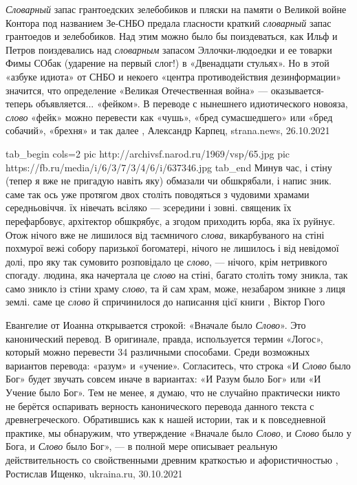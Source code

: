 \emph{Словарный} запас грантоедских зелебобиков и пляски на памяти о Великой войне
Контора под названием Зе-СНБО предала гласности краткий \emph{словарный} запас
грантоедов и зелебобиков. Над этим можно было бы поиздеваться, как Ильф и
Петров поиздевались над \emph{словарным} запасом Эллочки-людоедки и ее товарки Фимы
СОбак (ударение на первый слог!) в «Двенадцати стульях». Но в этой «азбуке
идиота» от СНБО и некоего «центра противодействия дезинформации» значится, что
определение «Великая Отечественная война» — оказывается- теперь объявляется...
«фейком». В переводе с нынешнего идиотического новояза, \emph{слово} «фейк» можно
перевести как «чушь», «бред сумасшедшего» или «бред собачий», «брехня» и так
далее
, 
Александр Карпец, strana.news, 26.10.2021


\ifcmt
  tab_begin cols=2
     pic http://archivsf.narod.ru/1969/vsp/65.jpg
     pic https://fb.ru/media/i/6/3/7/3/4/6/i/637346.jpg
  tab_end
\fi
Минув час, і стіну (тепер я вже не пригадую навіть яку) обмазали чи обшкрябали,
і напис зник. саме так ось уже протягом двох століть поводяться з чудовими
храмами середньовіччя. їх нівечать всіляко — зсередини і зовні.  священик їх
перефарбовує, архітектор обшкрябує, а згодом приходить юрба, яка їх руйнує.
Отож нічого вже не лишилося від таємничого \emph{слова}, викарбуваного на стіні
похмурої вежі собору паризької богоматері, нічого не лишилось і від невідомої
долі, про яку так сумовито розповідало це \emph{слово}, — нічого, крім
нетривкого спогаду. людина, яка начертала це \emph{слово} на стіні, багато
століть тому зникла, так само зникло із стіни храму \emph{слово}, та й сам
храм, може, незабаром зникне з лиця землі. саме це \emph{слово} й спричинилося
до написання цієї книги
, Віктор Гюго

Евангелие от Иоанна открывается строкой: «Вначале было \emph{Слово}». Это
канонический перевод. В оригинале, правда, используется термин «Логос», который
можно перевести 34 различными способами. Среди возможных вариантов перевода:
«разум» и «учение». Согласитесь, что строка «И \emph{Слово} было Бог» будет
звучать совсем иначе в вариантах: «И Разум было Бог» или «И Учение было Бог».
Тем не менее, я думаю, что не случайно практически никто не берётся оспаривать
верность канонического перевода данного текста с древнегреческого. Обратившись
как к нашей истории, так и к повседневной практике, мы обнаружим, что
утверждение «Вначале было \emph{Слово}, и \emph{Слово} было у Бога, и
\emph{Слово} было Бог», — в полной мере описывает реальную действительность со
свойственными древним краткостью и афористичностью
, 
Ростислав Ищенко, ukraina.ru, 30.10.2021

